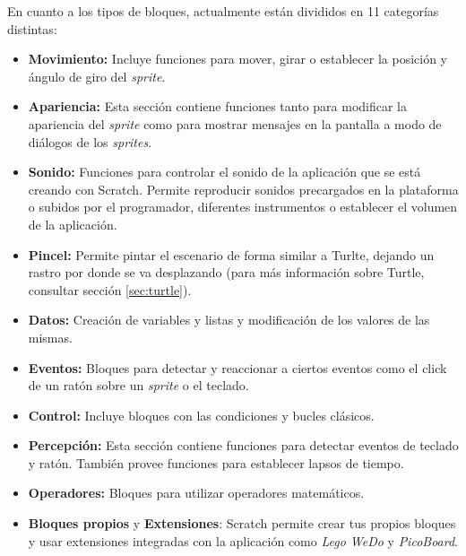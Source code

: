 En cuanto a los tipos de bloques, actualmente están divididos en 11 categorías distintas:
\begin{itemize}
	\item \textbf{Movimiento:} Incluye funciones para mover, girar o establecer la posición y ángulo de giro del \emph{sprite}.
	\item \textbf{Apariencia:} Esta sección contiene funciones tanto para modificar la apariencia del \emph{sprite} como para mostrar mensajes en la pantalla a modo de diálogos de los \emph{sprites}.
	\item \textbf{Sonido:} Funciones para controlar el sonido de la aplicación que se está creando con Scratch. Permite reproducir sonidos precargados en la plataforma o subidos por el programador, diferentes instrumentos o establecer el volumen de la aplicación.
	\item \textbf{Pincel:} Permite pintar el escenario de forma similar a Turlte, dejando un rastro por donde se va desplazando (para más información sobre Turtle, consultar sección \ref{sec:turtle}).
	\item \textbf{Datos:} Creación de variables y listas y modificación de los valores de las mismas.
	\item \textbf{Eventos:} Bloques para detectar y reaccionar a ciertos eventos como el click de un ratón sobre un \emph{sprite} o el teclado.
	\item \textbf{Control:} Incluye bloques con las condiciones y bucles clásicos.
	\item \textbf{Percepción:} Esta sección contiene funciones para detectar eventos de teclado y ratón. También provee funciones para establecer lapsos de tiempo. 
	\item \textbf{Operadores:} Bloques para utilizar operadores matemáticos.
	\item \textbf{Bloques propios} y \textbf{Extensiones}: Scratch permite crear tus propios bloques y usar extensiones integradas con la aplicación como \emph{Lego WeDo} y \emph{PicoBoard}. 
\end{itemize}


